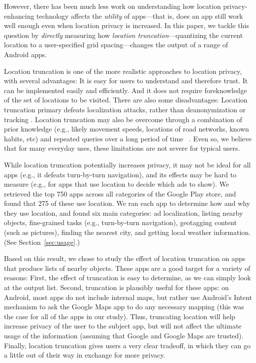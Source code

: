 \documentclass[10pt, conference, compsocconf]{IEEEtran}
\newcommand{\numinvestigatedapps}{750\xspace}
\newcommand{\numappsusinglocation}{275\xspace}
\begin{document}
However, there has been much less work \cite{Brush:2010} 
 on understanding
how location privacy-enhancing technology affects the \emph{utility}
of apps---that is, does an app still work well enough even when
location privacy is increased.  In this paper, we tackle this question
by \emph{directly} measuring how \emph{location truncation}---quantizing the
current location to a user-specified grid spacing---changes the output
of a range of Android apps.

Location truncation is one of the more realistic
approaches to location privacy, with several advantages: It is easy
for users to understand and therefore trust.  It can be implemented
easily and efficiently. And it does not require foreknowledge of the
set of locations to be visited. There are also some
disadvantages: Location truncation primary defeats localization
attacks, rather than deanonymization or tracking \cite{Krumm:2009}.
Location truncation may also be overcome through a
combination of prior knowledge (e.g., likely movement speeds,
locations of road networks, known habits, etc) and repeated queries
over a long period of time~\cite{Gruteser:2005} \cite{Krumm:2007}.
Even so, we believe that for many everyday uses, these limitations are
not severe for typical users.

While location truncation potentially increases privacy, it may not be
ideal for all apps (e.g., it defeats turn-by-turn navigation), and its
effects may be hard to measure (e.g., for apps that use location to
decide which ads to show).  We retrieved the top \numinvestigatedapps apps
across all categories of the Google Play store, and found that
\numappsusinglocation of these use location. We ran each app
to determine how and why they use location, and found six main
categories: ad
localization, listing nearby objects, fine-grained tasks (e.g.,
turn-by-turn navigation), geotagging content (such as pictures),
finding the nearest city, and getting local weather information. (See
Section~\ref{sec:usage}.)

Based on this result, we chose to study the effect of location
truncation on apps that produce lists of nearby objects. 
These apps
are a good target for a variety of reasons: First, the effect of
truncation is easy to determine, as we can simply look at the output
list. Second, truncation is plausibly useful for these apps: on
Android, most apps do not include internal maps, but rather use
Android's Intent mechanism to ask the Google Maps app to do any
necessary mapping (this was the case for all of the apps in our study).
Thus, truncating location will help increase privacy of the user to
the subject app, but will not affect the ultimate usage of the
information (assuming that Google and Google Maps are
trusted). 
Finally, location truncation gives users a very clear
tradeoff, in which they can go a little out of their way
 in exchange for more privacy.
\end{document}
